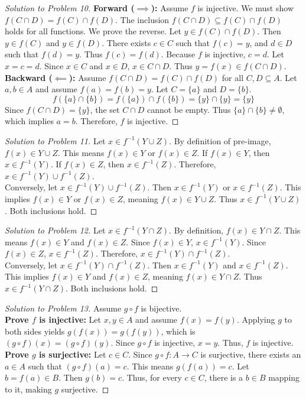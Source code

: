 \documentclass[11pt, letterpaper]{article}
\theoremstyle{definition}
\theoremstyle{remark}
\begin{document}
\begin{proof}[Solution to Problem 10]
\textbf{Forward ($\implies$):} Assume $f$ is injective. We must show $f(C \cap D) = f(C) \cap f(D)$.
The inclusion $f(C \cap D) \subseteq f(C) \cap f(D)$ holds for all functions. We prove the reverse. Let $y \in f(C) \cap f(D)$. Then $y \in f(C)$ and $y \in f(D)$. There exists $c \in C$ such that $f(c) = y$, and $d \in D$ such that $f(d) = y$. Thus $f(c) = f(d)$. Because $f$ is injective, $c = d$. Let $x = c = d$. Since $x \in C$ and $x \in D$, $x \in C \cap D$. Thus $y = f(x) \in f(C \cap D)$. \\
\textbf{Backward ($\impliedby$):} Assume $f(C \cap D) = f(C) \cap f(D)$ for all $C, D \subseteq A$. Let $a, b \in A$ and assume $f(a) = f(b) = y$. Let $C = \{a\}$ and $D = \{b\}$.
\[ f(\{a\} \cap \{b\}) = f(\{a\}) \cap f(\{b\}) = \{y\} \cap \{y\} = \{y\} \]
Since $f(C \cap D) = \{y\}$, the set $C \cap D$ cannot be empty. Thus $\{a\} \cap \{b\} \neq \emptyset$, which implies $a = b$. Therefore, $f$ is injective.
\end{proof}

\begin{proof}[Solution to Problem 11]
Let $x \in f^{-1}(Y \cup Z)$. By definition of pre-image, $f(x) \in Y \cup Z$. This means $f(x) \in Y$ or $f(x) \in Z$.
If $f(x) \in Y$, then $x \in f^{-1}(Y)$. If $f(x) \in Z$, then $x \in f^{-1}(Z)$. Therefore, $x \in f^{-1}(Y) \cup f^{-1}(Z)$. \\
Conversely, let $x \in f^{-1}(Y) \cup f^{-1}(Z)$. Then $x \in f^{-1}(Y)$ or $x \in f^{-1}(Z)$. This implies $f(x) \in Y$ or $f(x) \in Z$, meaning $f(x) \in Y \cup Z$. Thus $x \in f^{-1}(Y \cup Z)$. Both inclusions hold.
\end{proof}

\begin{proof}[Solution to Problem 12]
Let $x \in f^{-1}(Y \cap Z)$. By definition, $f(x) \in Y \cap Z$. This means $f(x) \in Y$ and $f(x) \in Z$.
Since $f(x) \in Y$, $x \in f^{-1}(Y)$. Since $f(x) \in Z$, $x \in f^{-1}(Z)$. Therefore, $x \in f^{-1}(Y) \cap f^{-1}(Z)$. \\
Conversely, let $x \in f^{-1}(Y) \cap f^{-1}(Z)$. Then $x \in f^{-1}(Y)$ and $x \in f^{-1}(Z)$. This implies $f(x) \in Y$ and $f(x) \in Z$, meaning $f(x) \in Y \cap Z$. Thus $x \in f^{-1}(Y \cap Z)$. Both inclusions hold.
\end{proof}

\begin{proof}[Solution to Problem 13]
Assume $g \circ f$ is bijective. \\
\textbf{Prove $f$ is injective:} Let $x, y \in A$ and assume $f(x) = f(y)$. Applying $g$ to both sides yields $g(f(x)) = g(f(y))$, which is $(g \circ f)(x) = (g \circ f)(y)$. Since $g \circ f$ is injective, $x = y$. Thus, $f$ is injective. \\
\textbf{Prove $g$ is surjective:} Let $c \in C$. Since $g \circ f : A \to C$ is surjective, there exists an $a \in A$ such that $(g \circ f)(a) = c$. This means $g(f(a)) = c$. Let $b = f(a) \in B$. Then $g(b) = c$. Thus, for every $c \in C$, there is a $b \in B$ mapping to it, making $g$ surjective.
\end{proof}
\end{document}
